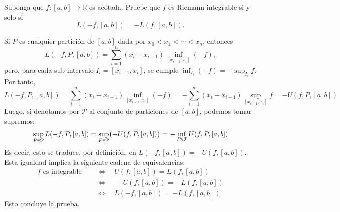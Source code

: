 \begin{ejer}
Suponga que $f \colon [a, b] \to \mathbb{R}$ es acotada. Pruebe que $f$ es Riemann integrable si y solo si
$$
L(-f, [a, b]) = -L(f, [a, b]).
$$
\end{ejer}
\begin{sol}
Si $P$ es cualquier partición de $[a,b]$ dada por $x_0<x_1<\cdots <x_n$, entonces
\[
L(-f,P,[a,b])=\sum_{i=1}^n(x_i-x_{i-1})\inf_{{[x_{i-1},x_i]}} (-f),
\]
pero, para cada sub-intervalo $I_i=[x_{i-1},x_i]$, se cumple $\inf_{I_i}(-f)=-\sup_{I_i}f$. Por tanto,
\[
L(-f,P,[a,b])%
=\sum_{i=1}^n(x_i-x_{i-1})\inf_{{[x_{i-1},x_i]}} (-f)
=-\sum_{i=1}^n(x_i-x_{i-1})\sup_{{[x_{i-1},x_i]}} f
= -U(f,P,[a,b])
\]
Luego, si denotamos por $\mathcal{P}$ al conjunto de particiones de $[a,b]$, podemos tomar supremos:
\[
\sup_{P\en\mathcal{P}} L(-f,P,[a,b])
=\sup_{P\en\mathcal{P}} \bigl(-U(f,P,[a,b])\bigr)
=-\inf_{P\en\mathcal{P}} U(f,P,[a,b])
\]
Es decir, esto se traduce, por definición, en $L(-f,[a,b]) = -U(f,[a,b])$. Esta igualdad implica la siguiente cadena de equivalencias:
\begin{align*}
f\text{ es integrable }%
\quad&\iff\quad
U(f,[a,b])=L(f,[a,b])\\
\quad&\iff\quad
-U(f,[a,b])=-L(f,[a,b])\\
\quad&\iff\quad
L(-f,[a,b])=-L(f,[a,b])%
\end{align*}
Esto concluye la prueba.
\end{sol}


